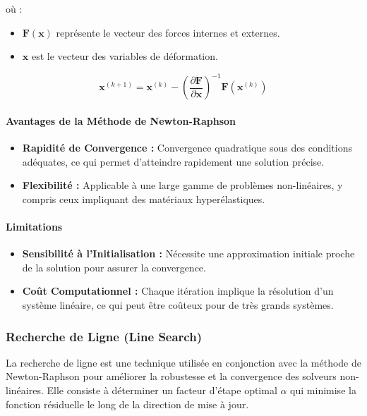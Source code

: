 où :
\begin{itemize}
    \item \( \mathbf{F}(\mathbf{x}) \) représente le vecteur des forces internes et externes.
    \item \( \mathbf{x} \) est le vecteur des variables de déformation.
\end{itemize}

\[
\mathbf{x}^{(k+1)} = \mathbf{x}^{(k)} - \left( \frac{\partial \mathbf{F}}{\partial \mathbf{x}} \right)^{-1} \mathbf{F}(\mathbf{x}^{(k)})
\]

\paragraph{Avantages de la Méthode de Newton-Raphson}
\begin{itemize}
    \item \textbf{Rapidité de Convergence :} Convergence quadratique sous des conditions adéquates, ce qui permet d'atteindre rapidement une solution précise.
    \item \textbf{Flexibilité :} Applicable à une large gamme de problèmes non-linéaires, y compris ceux impliquant des matériaux hyperélastiques.
\end{itemize}

\paragraph{Limitations}
\begin{itemize}
    \item \textbf{Sensibilité à l'Initialisation :} Nécessite une approximation initiale proche de la solution pour assurer la convergence.
    \item \textbf{Coût Computationnel :} Chaque itération implique la résolution d'un système linéaire, ce qui peut être coûteux pour de très grands systèmes.
\end{itemize}

\subsubsection{Recherche de Ligne (Line Search)}

La recherche de ligne est une technique utilisée en conjonction avec la méthode de Newton-Raphson pour améliorer la robustesse et la convergence des solveurs non-linéaires. Elle consiste à déterminer un facteur d'étape optimal \( \alpha \) qui minimise la fonction résiduelle le long de la direction de mise à jour.

